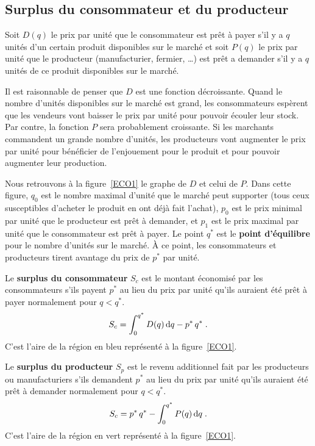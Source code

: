 {\subsection{Surplus du consommateur et du producteur} 

Soit $D(q)$ le prix par unité que le consommateur est prêt à payer s'il y a
$q$ unités d'un certain produit disponibles sur le marché et soit
$P(q)$ le prix par unité que le producteur (manufacturier, fermier,
\ldots) est prêt a demander s'il y a $q$ unités de ce produit
disponibles sur le marché.

Il est raisonnable de penser que $D$ est une fonction décroissante.
Quand le nombre d'unités disponibles sur le marché est grand, les
consommateurs espèrent que les vendeurs vont baisser le prix par unité
pour pouvoir écouler leur stock.  Par contre, la fonction $P$ sera
probablement croissante.  Si les marchants commandent un grande nombre
d'unités, les producteurs vont augmenter le prix par unité pour
bénéficier de l'enjouement pour le produit et pour pouvoir augmenter
leur production.

Nous retrouvons à la figure~\ref{ECO1} le graphe de $D$ et celui de $P$.  Dans
cette figure, $q_0$ est le nombre maximal d'unité que le marché peut
supporter (tous ceux susceptibles d'acheter le produit en ont déjà fait
l'achat), $p_0$ est le prix minimal par unité que le producteur est
prêt à demander, et $p_1$ est le prix maximal par unité que le
consommateur est prêt à payer.  Le point $q^\ast$ est le
{\bfseries point d'équilibre} pour le nombre d'unités sur le marché.  À ce
point, les consommateurs et producteurs tirent avantage
du prix de $p^\ast$ par unité.


Le {\bfseries surplus du consommateur}
$S_c$ est le montant économisé par les consommateurs s'ils payent
$p^\ast$ au lieu du prix par unité qu'ils auraient été prêt à payer
normalement pour $q < q^\ast$.
\[
S_c = \int_0^{q^\ast} D(q) \,\mathrm{d}q - p^\ast \, q^\ast \; .
\]
C'est l'aire de la région en bleu représenté à la figure~\ref{ECO1}. 

Le {\bfseries surplus du producteur}
$S_p$ est le revenu additionnel fait par les producteurs ou
manufacturiers s'ils demandent $p^\ast$ au lieu du prix par unité
qu'ils auraient été prêt à demander normalement pour $q < q^\ast$.
\[
S_c = p^\ast \, q^\ast - \int_0^{q^\ast} P(q) \,\mathrm{d}q \; .
\]
C'est l'aire de la région en vert représenté à la figure~\ref{ECO1}. 

}
